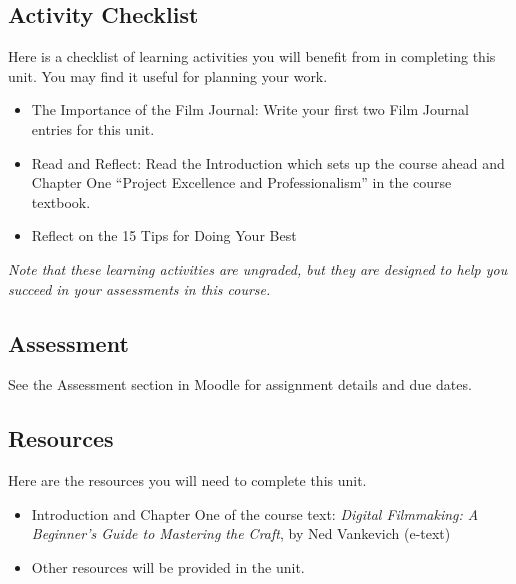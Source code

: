 \documentclass[
]{book}
\providecommand{\tightlist}{%
  \setlength{\itemsep}{0pt}\setlength{\parskip}{0pt}}
\begin{document}
\hypertarget{activity-checklist}{%
\subsection*{Activity Checklist}\label{activity-checklist}}

\begin{reflect}
Here is a checklist of learning activities you will benefit from in completing this unit. You may find it useful for planning your work.

\begin{itemize}
\tightlist
\item
  The Importance of the Film Journal: Write your first two Film Journal entries for this unit.
\item
  Read and Reflect: Read the Introduction which sets up the course ahead and Chapter One ``Project Excellence and Professionalism'' in the course textbook.
\item
  Reflect on the 15 Tips for Doing Your Best
\end{itemize}

\emph{Note that these learning activities are ungraded, but they are designed to help you succeed in your assessments in this course.}
\end{reflect}

\hypertarget{assessment}{%
\subsection*{Assessment}\label{assessment}}

See the Assessment section in Moodle for assignment details and due dates.

\hypertarget{resources}{%
\subsection*{Resources}\label{resources}}

Here are the resources you will need to complete this unit.

\begin{itemize}
\tightlist
\item
  Introduction and Chapter One of the course text: \emph{Digital Filmmaking: A Beginner's Guide to Mastering the Craft}, by Ned Vankevich (e-text)
\item
  Other resources will be provided in the unit.
\end{itemize}
\end{document}
